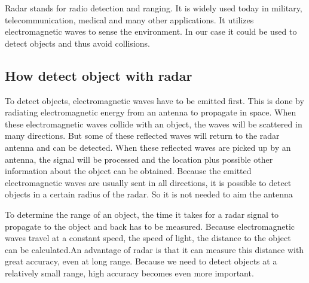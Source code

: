 \documentclass{article}
\begin{document}
Radar stands for radio detection and ranging. It is widely used today in military, telecommunication, medical and many other applications. It utilizes electromagnetic waves to sense the environment. In our case it could be used to detect objects and thus avoid collisions.

\subsection{How detect object with radar}

To detect objects, electromagnetic waves have to be emitted first. This is done by radiating electromagnetic energy from an antenna to propagate in space. When these electromagnetic waves collide with an object, the waves will be scattered in many directions. But some of these reflected waves will return to the radar antenna and can be detected. When these reflected waves are picked up by an antenna, the signal will be processed and the location plus possible other information about the object can be obtained. Because the emitted electromagnetic waves are usually sent in all directions, it is possible to detect objects in a certain radius of the radar. So it is not needed to aim the antenna

To determine the range of an object, the time it takes for a radar signal to propagate to the object and back has to be measured. Because electromagnetic waves travel at a constant speed, the speed of light, the distance to the object can be calculated.An advantage of radar is that it can measure this distance with great accuracy, even at long range. Because we need to detect objects at a relatively small range, high accuracy becomes even more important.
\end{document}
